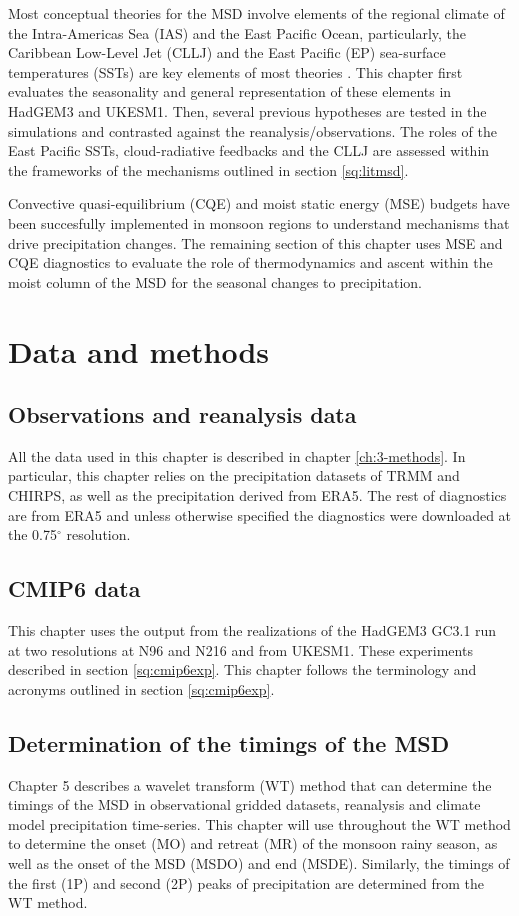 Most conceptual theories for the MSD involve elements of the regional climate of the Intra-Americas Sea (IAS) and the East Pacific Ocean, particularly, the Caribbean Low-Level Jet (CLLJ) and the East Pacific (EP) sea-surface temperatures (SSTs) are key elements of most theories \citep{gamble2008,herrera2015}.
This chapter first evaluates the seasonality and general representation of these elements in HadGEM3 and UKESM1. 
Then, several previous hypotheses are tested in the simulations and contrasted against the reanalysis/observations. 
The roles of the East Pacific SSTs, cloud-radiative feedbacks and the CLLJ are assessed within the frameworks of the mechanisms outlined in section \ref{sq:litmsd}. 


Convective quasi-equilibrium (CQE) and moist static energy (MSE) budgets have been succesfully implemented in monsoon regions to understand mechanisms that drive precipitation changes. The remaining section of this chapter uses MSE and CQE diagnostics to evaluate the role of thermodynamics and ascent within the moist column of the MSD for the seasonal changes to precipitation. 


\section{Data and methods}

\subsection{Observations and reanalysis data}

All the data used in this chapter is described in chapter \ref{ch:3-methods}. In particular, this chapter relies on the precipitation datasets of TRMM and CHIRPS, as well as the precipitation derived from ERA5. The rest of diagnostics are from ERA5 and unless otherwise specified the diagnostics were downloaded at the 0.75$^\circ$ resolution.

\subsection{CMIP6 data}

This chapter uses the output from the realizations of the HadGEM3 GC3.1 run at two resolutions at N96 and N216 and from UKESM1. These experiments described in section \ref{sq:cmip6exp}. This chapter follows the terminology and acronyms outlined in section \ref{sq:cmip6exp}. 

\subsection{Determination of the timings of the MSD}
Chapter 5 describes a wavelet transform (WT) method that can determine the timings of the MSD in observational gridded datasets, reanalysis and climate model precipitation time-series. 
This chapter will use throughout the WT method to determine the onset (MO) and retreat (MR) of the monsoon rainy season, as well as the onset of the MSD (MSDO) and end (MSDE). Similarly, the timings of the first (1P) and second (2P) peaks of precipitation are determined from the WT method. 

